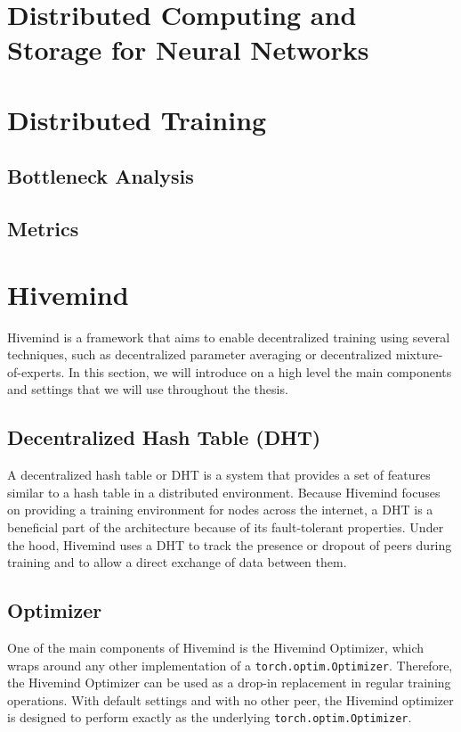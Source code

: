 \section{Distributed Computing and Storage for Neural Networks}

\section{Distributed Training}

\subsection{Bottleneck Analysis}

\subsection{Metrics}

\section{Hivemind}
Hivemind is a framework that aims to enable decentralized training using several techniques, such as decentralized parameter averaging or decentralized mixture-of-experts.
In this section, we will introduce on a high level the main components and settings that we will use throughout the thesis.

\subsection{Decentralized Hash Table (DHT)}
A decentralized hash table or DHT is a system that provides a set of features similar to a hash table in a distributed environment.
Because Hivemind focuses on providing a training environment for nodes across the internet, a DHT is a beneficial part of the architecture because of its fault-tolerant properties.
Under the hood, Hivemind uses a DHT to track the presence or dropout of peers during training and to allow a direct exchange of data between them.

\subsection{Optimizer}
One of the main components of Hivemind is the Hivemind Optimizer, which wraps around any other implementation of a \texttt{torch.optim.Optimizer}.
Therefore, the Hivemind Optimizer can be used as a drop-in replacement in regular training operations.
With default settings and with no other peer, the Hivemind optimizer is designed to perform exactly as the underlying \texttt{torch.optim.Optimizer}.

